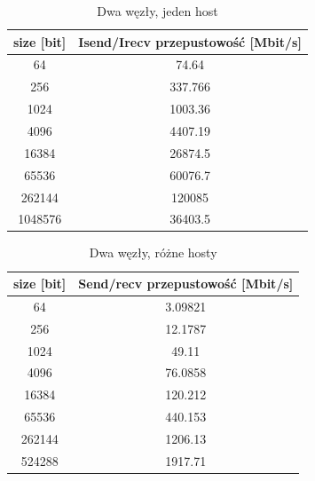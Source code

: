 \documentclass[10pt,english, openany]{book}
\begin{document}
\begin{table}[H]
\caption{Dwa węzły, jeden host}
\begin{center}
\begin{tabular}{|c|c|}
\hline
size {[}bit{]} & Isend/Irecv przepustowość {[}Mbit/s{]} \\ \hline
64           & 74.64                                  \\ \hline
256          & 337.766                                \\ \hline
1024         & 1003.36                                \\ \hline
4096         & 4407.19                                \\ \hline
16384        & 26874.5                                \\ \hline
65536        & 60076.7                                \\ \hline
262144       & 120085                                 \\ \hline
1048576      & 36403.5                                \\ \hline
\end{tabular}
\end{center}
\end{table}

\begin{table}[H]
\caption{Dwa węzły, różne hosty}
\begin{center}
\begin{tabular}{|c|c|}
\hline
size {[}bit{]} & Send/recv przepustowość {[}Mbit/s{]} \\ \hline
64           & 3.09821                              \\ \hline
256          & 12.1787                              \\ \hline
1024         & 49.11                                \\ \hline
4096         & 76.0858                              \\ \hline
16384        & 120.212                              \\ \hline
65536        & 440.153                              \\ \hline
262144       & 1206.13                              \\ \hline
524288       & 1917.71                              \\ \hline
\end{tabular}
\end{center}
\end{table}
\end{document}
